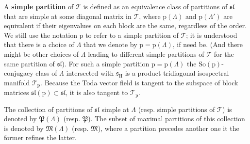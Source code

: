 \documentclass[reqno]{amsart}
\newcommand{\p}{\mathrm{p}}
\renewcommand{\ss}{\mathfrak{s}}
\renewcommand{\sl}{\mathfrak{sl}}
\newcommand{\cT}{\mathcal{T}}
\newcommand{\So}{\mathrm{So}}
\renewcommand{\H}{\mathrm{H}}
\begin{document}
 A  {\bf simple partition}  of $\cT$
 is defined as an equivalence class of partitions of $\sl$ that are simple at some  diagonal matrix in $\cT$, where $\p(\Lambda)$ and $\p(\Lambda')$ are equivalent if their eigenvalues on each block are the same, regardless of the order. We still use the notation $\p$ to refer to a simple partition of $\cT$; it is understood that there is a choice of $\Lambda$ that we denote by $\p=\p(\Lambda)$, if need be. (And there might be other choices of $\Lambda$ leading to different simple partitions of $\cT$ for the same partition of $\sl$). For such a simple partition $\p=\p(\Lambda)$ the $\So(\p)$-conjugacy class of $\Lambda$ intersected with $\ss_\H$ is  a product tridiagonal isospectral manifold $\cT_\p$. Because the Toda vector field is tangent to the subspace of block matrices $\sl(\p)\subset \sl$, it is also tangent to $\cT_\p$.

 The collection of partitions of $\sl$ simple at $\Lambda$ (resp. simple partitions of $\cT$) is denoted by $\mathfrak{P}(\Lambda)$ (resp. $\mathfrak{P}$). The subset of maximal  partitions of this collection is denoted by $\mathfrak{M}(\Lambda)$ (resp. $\mathfrak{M}$), where a partition precedes another one it the former refines the latter.
\end{document}

